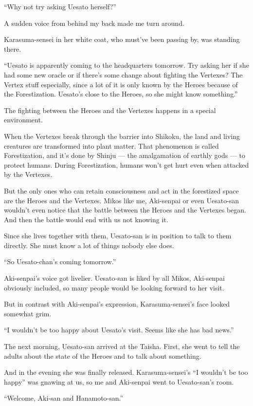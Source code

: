 ``Why not try asking Uesato herself?''

A sudden voice from behind my back made me turn around.

Karasuma-sensei in her white coat, who must've been passing by, was standing there.

``Uesato is apparently coming to the headquarters tomorrow. Try asking her if she had some new oracle or if there's some change about fighting the Vertexes? The Vertex stuff especially, since a lot of it is only known by the Heroes because of the Forestization. Uesato's close to the Heroes, so she might know something.''

The fighting between the Heroes and the Vertexes happens in a special environment.

When the Vertexes break through the barrier into Shikoku, the land and living creatures are transformed into plant matter. That phenomenon is called Forestization, and it's done by Shinju --- the amalgamation of earthly gods --- to protect humans. During Forestization, humans won't get hurt even when attacked by the Vertexes.

But the only ones who can retain consciousness and act in the forestized space are the Heroes and the Vertexes. Mikos like me, Aki-senpai or even Uesato-san wouldn't even notice that the battle between the Heroes and the Vertexes began. And then the battle would end with us not knowing it.

Since she lives together with them, Uesato-san is in position to talk to them directly. She must know a lot of things nobody else does.

``So Uesato-chan's coming tomorrow.''

Aki-senpai's voice got livelier. Uesato-san is liked by all Mikos, Aki-senpai obviously included, so many people would be looking forward to her visit.

But in contrast with Aki-senpai's expression, Karasuma-sensei's face looked somewhat grim.

``I wouldn't be too happy about Uesato's visit. Seems like she has bad news.''

The next morning, Uesato-san arrived at the Taisha. First, she went to tell the adults about the state of the Heroes and to talk about something.

And in the evening she was finally released. Karasuma-sensei's ``I wouldn't be too happy'' was gnawing at us, so me and Aki-senpai went to Uesato-san's room.

``Welcome, Aki-san and Hanamoto-san.''


